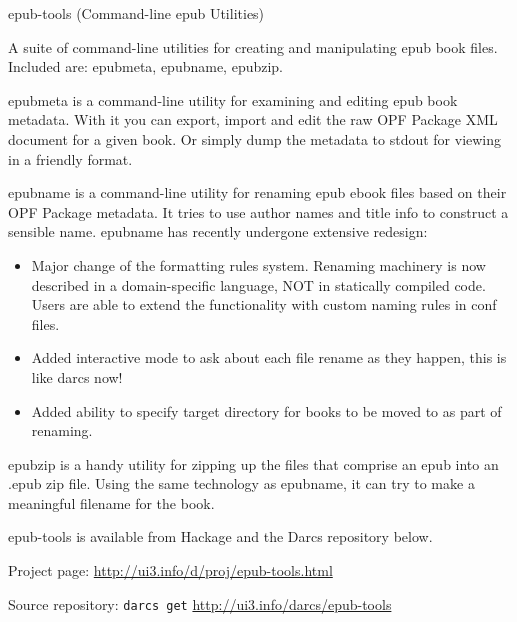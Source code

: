 \begin{hcarentry}[updated]{epub-tools (Command-line epub Utilities)}
\label{epubtools}
\makeheader

A suite of command-line utilities for creating and manipulating epub book files. Included are: epubmeta, epubname, epubzip.

epubmeta is a command-line utility for examining and editing epub book metadata. With it you can export, import and edit the raw OPF Package XML document for a given book. Or simply dump the metadata to stdout for viewing in a friendly format.

epubname is a command-line utility for renaming epub ebook files based on their OPF Package metadata. It tries to use author names and title info to construct a sensible name. epubname has recently undergone extensive redesign:

\begin{itemize}
\item Major change of the formatting rules system. Renaming machinery is now described in a domain-specific language, NOT in statically compiled code. Users are able to extend the functionality with custom naming rules in conf files.

\item Added interactive mode to ask about each file rename as they happen, this is like darcs now!

\item Added ability to specify target directory for books to be moved to as part of renaming.
\end{itemize}

epubzip is a handy utility for zipping up the files that comprise an epub into an .epub zip file. Using the same technology as epubname, it can try to make a meaningful filename for the book.

epub-tools is available from Hackage and the Darcs repository below.

\FurtherReading
\begin{compactitem}
\item Project page:
\url{http://ui3.info/d/proj/epub-tools.html}

\item Source repository:
\texttt{darcs get} \url{http://ui3.info/darcs/epub-tools}
\end{compactitem}
\end{hcarentry}
